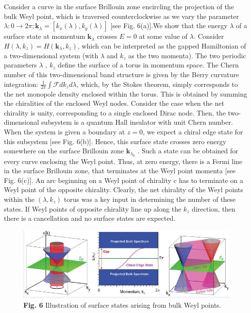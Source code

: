 \documentclass[letterpaper,10pt,english]{sphinxmanual}
\begin{document}
Consider a curve in the surface Brillouin zone encircling the projection of the bulk Weyl point, which is traversed counterclockwise as we vary the parameter \(\lambda: 0 \to 2\pi; \mathbf{k}_{\lambda} = [k_x (\lambda),k_y (\lambda)]\) {[}see Fig. 6(a){]}.We show that the energy \(\lambda\) of a surface state at momentum \(\mathbf{k}_{\lambda}\) crosses \(E = 0\) at some value of \(\lambda\). Consider \(H(\lambda,k_z) = H(\mathbf{k}_{\lambda},k_z)\), which can be interpreted as the gapped Hamiltonian of a two-dimensional system (with \(\lambda\) and \(k_z\) as the two momenta). The two periodic parameters \(\lambda\) , \(k_z\) define the surface of a torus in momentum space. The Chern number of this two-dimensional band structure is given by the Berry curvature integration: \(\frac{1}{2\pi}\int\mathscr{F}dk_zd\lambda\), which, by the Stokes theorem, simply corresponds to the net monopole density enclosed within the torus. This is obtained by summing the chiralities of the enclosed Weyl nodes. Consider the case when the net chirality is unity, corresponding to a single enclosed Dirac node. Then, the two-dimensional subsystem is a quantum Hall insulator with unit Chern number. When the
system is given a boundary at \(z = 0\), we expect a chiral edge state for this subsystem {[}see Fig. 6(b){]}. Hence, this surface state crosses zero energy somewhere on the surface Brillouin zone \(\mathbf{k}_{\lambda_0}\) . Such a state can be obtained for every curve enclosing the Weyl point. Thus, at zero energy, there is a Fermi line in the surface Brillouin zone, that terminates at the Weyl point momenta {[}see Fig. 6(c){]}. An arc beginning on a Weyl point of chirality c has to terminate on a Weyl point of the opposite chirality. Clearly, the net chirality of the Weyl points within the \((\lambda,k_z)\) torus was a key input in determining the number of these states. If Weyl points of opposite chirality line up along
the \(k_z\) direction, then there is a cancellation and no surface states are expected.
\begin{figure}[htbp]
\centering
\capstart

\includegraphics[width=0.700\linewidth]{6.png}
\caption{\textbf{Fig. 6} Illustration of surface states arising from bulk Weyl points.}\end{figure}
\end{document}
